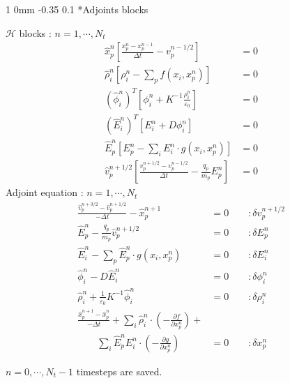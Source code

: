 \documentclass[11pt]{article}
\makeatletter
\renewcommand{\subsection}{\@startsection
{subsection}%
{1}%
{0mm}%
{-0.35\baselineskip}%
{0.1\baselineskip}%
{\normalfont\large\bfseries\color{brown}}}%
\def\Dpartial#1#2{ \frac{\partial #1}{\partial #2} }
\newcommand{\vp}{v_p}
\newcommand{\xp}{x_p}
\newcommand{\Dt}{\Delta t}
\newcommand{\vph}{\hat{v}_p}
\newcommand{\xph}{\hat{x}_p}
\newcommand{\Eh}{\hat{E}}
\newcommand{\phih}{\hat{\phi}}
\newcommand{\rhoh}{\hat{\rho}}
\newcommand{\cH}{\mathcal{H}}
\makeatother
\begin{document}
\subsection*{Adjoints blocks}

\begin{multicols}{2}
$\cH$ blocks : $n=1,\cdots,N_t$
\begin{equation*}
\begin{split}
\xph^{n}\left[ \frac{\xp^{n} - \xp^{n-1}}{\Dt} - \vp^{n-1/2} \right] &= 0\\
\rhoh_{i}^n\left[ \rho_{i}^n - \sum\limits_p f\left( x_{i}, x_p^n \right) \right] &= 0\\
\left( \phih_i^{n} \right)^T\left[ \phi_i^n + K^{-1}\frac{\rho_i^n}{\varepsilon_0} \right] &= 0\\
\left( \Eh_i^n \right)^T\left[ E_i^n + D\phi_i^n \right] &= 0\\
\Eh_{p}^{n}\left[ E_{p}^{n} - \sum\limits_{i}E_{i}^{n}\cdot g\left( x_{i}, x_p^{n} \right) \right] &= 0\\
\vph^{n+1/2}\left[ \frac{\vp^{n+1/2} - \vp^{n-1/2}}{\Dt} - \frac{q_p}{m_p}E_p^{n} \right] &= 0
\end{split}
\end{equation*}
Adjoint equation : $n=1,\cdots,N_t$
\begin{equation*}
\begin{split}
\frac{\vph^{n+3/2} - \vph^{n+1/2}}{-\Dt} - \xph^{n+1} &= 0\qquad:\delta \vp^{n+1/2}\\
\Eh_{p}^{n} - \frac{q_p}{m_p}\vph^{n+1/2} &= 0\qquad:\delta E_p^{n}\\
\Eh_{i}^{n} - \sum\limits_p \Eh_{p}^{n}\cdot g\left( x_{i}, x_p^{n} \right) &= 0\qquad:\delta E_i^{n}\\
\phih_i^{n} - D\Eh_i^{n} &= 0\qquad:\delta \phi_i^{n}\\
\rhoh_i^{n} + \frac{1}{\varepsilon_0}K^{-1}\phih_i^{n} &= 0\qquad:\delta \rho_i^{n}\\
\frac{\xph^{n+1} - \xph^{n}}{-\Dt} + \sum\limits_{i}\rhoh_{i}^{n}\cdot\left( -\Dpartial{f}{x_p^{n}} \right) + &\\
\qquad\sum\limits_{i} \Eh_{p}^{n}E_{i}^{n}\cdot\left( -\Dpartial{g}{x_p^{n}} \right) &= 0\qquad:\delta \xp^{n}
\end{split}
\end{equation*}
\end{multicols}
$n=0,\cdots,N_t-1$ timesteps are saved.
\end{document}
